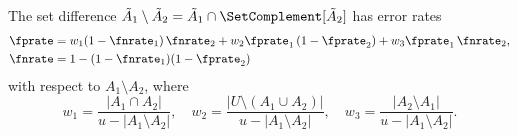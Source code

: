 \begin{theorem}
\label{thm:setdiff_rates}
The set difference $\tilde{A}_1 \setminus \tilde{A}_2
= \tilde{A}_1 \cap \SetComplement[\tilde{A}_2]$ has error rates
\begin{align}
\label{eq:setdiff_fpr}
\fprate &= w_1 (1 - \fnrate_1)\, \fnrate_2
          + w_2 \fprate_1\, (1 - \fprate_2)
          + w_3 \fprate_1\, \fnrate_2, \\
\label{eq:setdiff_fnr}
\fnrate &= 1 - (1 - \fnrate_1)(1 - \fprate_2)
\end{align}
with respect to $A_1 \setminus A_2$, where
\begin{equation}
\label{eq:setdiff_weights}
w_1 = \frac{|A_1 \cap A_2|}{u - |A_1 \setminus A_2|}, \quad
w_2 = \frac{|U \setminus (A_1 \cup A_2)|}{u - |A_1 \setminus A_2|}, \quad
w_3 = \frac{|A_2 \setminus A_1|}{u - |A_1 \setminus A_2|}.
\end{equation}
\end{theorem}
